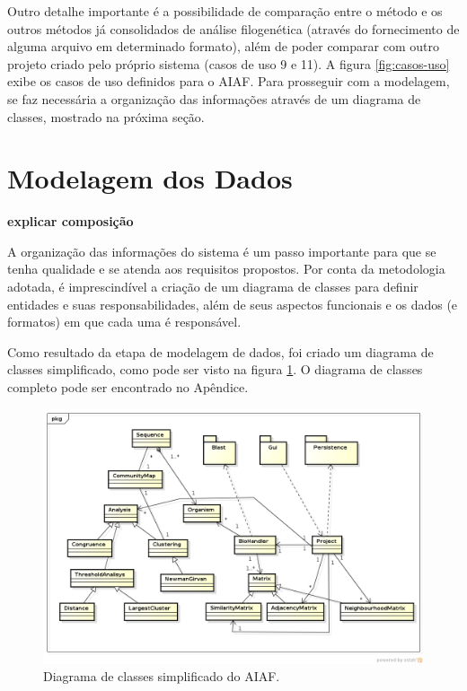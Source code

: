 Outro detalhe importante é a possibilidade de comparação entre o método e os outros métodos já consolidados de análise filogenética (através do fornecimento
de alguma arquivo em determinado formato), além de poder comparar com outro projeto criado pelo próprio sistema (casos de uso 9 e 11). A figura
\ref{fig:casos-uso} exibe os casos de uso definidos para o AIAF. Para prosseguir com a modelagem, se faz necessária a organização das informações através
de um diagrama de classes, mostrado na próxima seção.

\section{Modelagem dos Dados} \label{sec:organizacao}

\textbf{explicar composição}

A organização das informações do sistema é um passo importante para que se tenha qualidade e se atenda aos requisitos propostos. Por conta da metodologia
adotada, é imprescindível a criação de um diagrama de classes para definir entidades e suas responsabilidades, além de seus aspectos funcionais e os dados
(e formatos) em que cada uma é responsável.

Como resultado da etapa de modelagem de dados, foi criado um diagrama de classes simplificado, como pode ser visto na figura
\ref{fig:diagrama-classes-simplificado}. O diagrama de classes completo pode ser encontrado no Apêndice.

\begin{figure}
\centering
\includegraphics[scale=0.52]{diagrama-classes-simplificado}
\caption{Diagrama de classes simplificado do AIAF.}
\label{fig:diagrama-classes-simplificado}
\end{figure}

